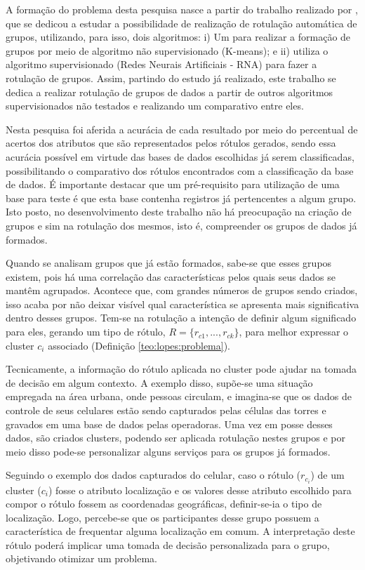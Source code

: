 A formação do problema desta pesquisa nasce a partir do trabalho realizado por \cite{Lopes2016}, que se dedicou a estudar a possibilidade de realização de rotulação automática de grupos, utilizando, para isso, dois algoritmos: i) Um para realizar a formação de grupos por meio de algoritmo não supervisionado (K-means); e ii) utiliza o algoritmo supervisionado (Redes Neurais Artificiais - RNA) para fazer a rotulação de grupos. Assim, partindo do estudo já realizado, este trabalho se dedica a realizar rotulação de grupos de dados a partir de outros algoritmos supervisionados não testados e realizando um comparativo entre eles. 

Nesta pesquisa foi aferida a acurácia de cada resultado por meio do percentual de acertos dos atributos que são representados pelos rótulos gerados, sendo essa acurácia possível em virtude das bases de dados escolhidas já serem classificadas, possibilitando o comparativo dos rótulos encontrados com a classificação da base de dados. É importante destacar que um pré-requisito para utilização de uma base para teste é que esta base contenha registros já pertencentes a algum grupo. Isto posto, no desenvolvimento deste trabalho não há preocupação na criação de grupos e sim na rotulação dos mesmos, isto é, compreender os grupos de dados já formados. 

Quando se analisam grupos que já estão formados, sabe-se que esses grupos existem, pois há uma correlação das características pelos quais seus dados se mantêm agrupados. Acontece que, com grandes números de grupos sendo criados, isso acaba por não deixar visível qual característica se apresenta mais significativa dentro desses grupos. Tem-se na rotulação a intenção de definir algum significado para eles, gerando um tipo de rótulo, ${ R=\{ r_{c1},...,r_{ck} \} }$, para melhor expressar o cluster ${c_i}$ associado (Definição \ref{teo:lopes:problema}).

Tecnicamente, a informação do rótulo aplicada no cluster pode ajudar na tomada de decisão em algum contexto. A exemplo disso, supõe-se uma situação empregada na área urbana, onde pessoas circulam, e imagina-se que os dados de controle de seus celulares estão sendo capturados pelas células das torres e gravados em uma base de dados pelas operadoras. Uma vez em posse desses dados, são criados clusters, podendo ser aplicada rotulação nestes grupos e por meio disso pode-se personalizar alguns serviços para os grupos já formados.

Seguindo o exemplo dos dados capturados do celular, caso o rótulo (${r_{c_i}}$) de um cluster (${c_i}$) fosse o atributo localização e os valores desse atributo escolhido para compor o rótulo fossem as coordenadas geográficas, definir-se-ia o tipo de localização. Logo, percebe-se que os participantes desse grupo possuem a característica de frequentar alguma localização em comum. A interpretação deste rótulo poderá implicar uma tomada de decisão personalizada para o grupo, objetivando otimizar um problema. 

